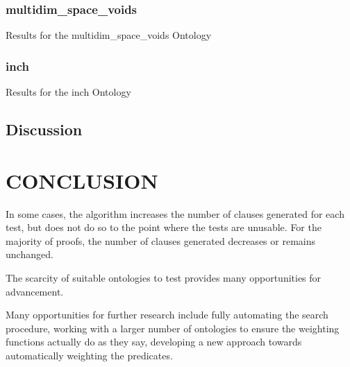 \documentclass{article}
\begin{document}
\subsubsection{multidim\_space\_voids}
\begin{table}[h]
\centering
{}
\caption{Results for the multidim\_space\_voids Ontology}
\end{table}

\subsubsection{inch}
\begin{table}[h]
\centering
{}
\caption{Results for the inch Ontology}
\end{table}

\subsection{Discussion}

\newpage
\vspace*{.05in}
\section{\MakeUppercase{Conclusion}}

In some cases, the algorithm increases the number of clauses generated for each test, but does not do so to the point where the tests are unusable. For the majority of proofs, the number of clauses generated decreases or remains unchanged.

The scarcity of suitable ontologies to test provides many opportunities for advancement. 

Many opportunities for further research include fully automating the search procedure, working with a larger number of ontologies to ensure the weighting functions actually do as they say, developing a new approach towards automatically weighting the predicates. 
\newpage
{}
\vspace*{.05in}
\printbibliography

\newpage
\appendix
\end{document}
